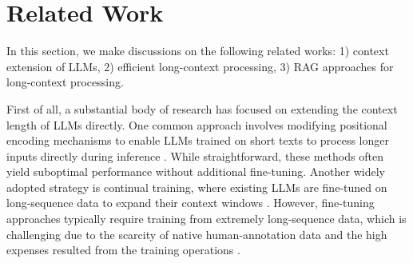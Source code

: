 \section{Related Work}
In this section, we make discussions on the following related works: 1) context extension of LLMs, 2) efficient long-context processing, 3) RAG approaches for long-context processing.  

First of all, a substantial body of research has focused on extending the context length of LLMs directly. One common approach involves modifying positional encoding mechanisms to enable LLMs trained on short texts to process longer inputs directly during inference \citep{chen2023extending, peng2023yarn, ding2024longrope}. While straightforward, these methods often yield suboptimal performance without additional fine-tuning. Another widely adopted strategy is continual training, where existing LLMs are fine-tuned on long-sequence data to expand their context windows \citep{li2023long, chen2023longlora, mohtashami2023landmark, xiong2023effective}. However, fine-tuning approaches typically require training from extremely long-sequence data, which is challenging due to the scarcity of native human-annotation data and the high expenses resulted from the training operations \citep{fu2024data, gao2024train}. 


